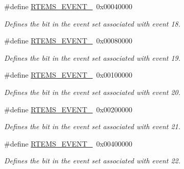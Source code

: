 \begin{DoxyCompactItemize}
\mbox{\label{group__ClassicEventSet_gaad48eac5508ff39a874a03c33fc053bf}} 
\#define \mbox{\hyperlink{group__ClassicEventSet_gaad48eac5508ff39a874a03c33fc053bf}{R\+T\+E\+M\+S\+\_\+\+E\+V\+E\+N\+T\+\_}}~0x00040000
\begin{DoxyCompactList}\small\item\em Defines the bit in the event set associated with event 18. \end{DoxyCompactList}\item 
\mbox{\label{group__ClassicEventSet_ga85fabc9f8073fc76387d61550d16c1d2}} 
\#define \mbox{\hyperlink{group__ClassicEventSet_ga85fabc9f8073fc76387d61550d16c1d2}{R\+T\+E\+M\+S\+\_\+\+E\+V\+E\+N\+T\+\_}}~0x00080000
\begin{DoxyCompactList}\small\item\em Defines the bit in the event set associated with event 19. \end{DoxyCompactList}\item 
\mbox{\label{group__ClassicEventSet_ga916f3191ea89c2866ebd2aa02d9ee1a5}} 
\#define \mbox{\hyperlink{group__ClassicEventSet_ga916f3191ea89c2866ebd2aa02d9ee1a5}{R\+T\+E\+M\+S\+\_\+\+E\+V\+E\+N\+T\+\_}}~0x00100000
\begin{DoxyCompactList}\small\item\em Defines the bit in the event set associated with event 20. \end{DoxyCompactList}\item 
\mbox{\label{group__ClassicEventSet_ga360e47bd7fd3569acfc05ca496fc4585}} 
\#define \mbox{\hyperlink{group__ClassicEventSet_ga360e47bd7fd3569acfc05ca496fc4585}{R\+T\+E\+M\+S\+\_\+\+E\+V\+E\+N\+T\+\_}}~0x00200000
\begin{DoxyCompactList}\small\item\em Defines the bit in the event set associated with event 21. \end{DoxyCompactList}\item 
\mbox{\label{group__ClassicEventSet_ga154ef65c1d3d7d6b4bc304385d06106c}} 
\#define \mbox{\hyperlink{group__ClassicEventSet_ga154ef65c1d3d7d6b4bc304385d06106c}{R\+T\+E\+M\+S\+\_\+\+E\+V\+E\+N\+T\+\_}}~0x00400000
\begin{DoxyCompactList}\small\item\em Defines the bit in the event set associated with event 22. \end{DoxyCompactList}\item 

\end{DoxyCompactItemize}

